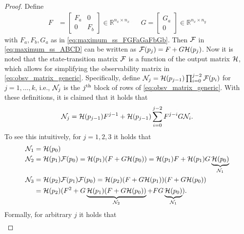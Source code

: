 \begin{proof}
    Define
    \begin{align}
        F &= \left[\begin{array}{c|c}
        F_a & 0 \\ \hline 0 & F_b
        \end{array}\right]
        \in \mathbb{R}^{n_x \times n_x} 
        & & 
        G = \left[\begin{array}{c}
            G_a \\ \hline 0
        \end{array}\right]
        \in \mathbb{R}^{n_x \times n_y}
        \label{eq:maximum_ss_F_G}
    \end{align}
    with $F_a,F_b,G_a$ as in \eqref{eq:maximum_ss_FGFaGaFbGb}. Then $\mathcal{F}$ in \eqref{eq:maximum_ss_ABCD} can be written as $\mathcal{F}(p_j) = F + G \mathcal{H}(p_j)$. Now it is noted that the state-transition matrix $\mathcal{F}$ is a function of the output matrix $\mathcal{H}$, which allows for simplifying the observability matrix in \eqref{eq:obsv_matrix_generic}. Specifically, define $\mathcal{N}_j = \mathcal{H}(p_{j-1}) \prod_{i=0}^{j-2} \mathcal{F}(p_i)$ for $j=1,\ldots,k$, i.e., $\mathcal{N}_j$ is the $j^{\textnormal{th}}$ block of rows of \eqref{eq:obsv_matrix_generic}. With these definitions, it is claimed that it holds that
    \begin{equation}\label{eq:aux}
        \mathcal{N}_j =  \mathcal{H}(p_{j-1}) F^{j-1} +  \mathcal{H}(p_{j-1}) \sum_{i=0}^{j-2} F^{j-i}G \mathcal{N}_i.
    \end{equation}
    To see this intuitively, for $j=1,2,3$ it holds that
    \begin{equation}
    \begin{aligned}
        \mathcal{N}_1 &= \mathcal{H}(p_0) \\
        \mathcal{N}_2 &= \mathcal{H}(p_1) \mathcal{F}(p_0) = \mathcal{H}(p_1) (F + G \mathcal{H}(p_0)) = \mathcal{H}(p_1) F + \mathcal{H}(p_1) G \underbrace{\mathcal{H}(p_0)}_{\mathcal{N}_1} \\
        \mathcal{N}_3 &= \mathcal{H}(p_2) \mathcal{F}(p_1) \mathcal{F}(p_0) = \mathcal{H}(p_2) (F + G \mathcal{H}(p_1)) (F + G \mathcal{H}(p_0)) \\
        &= \mathcal{H}(p_2) (F^2 + G \underbrace{\mathcal{H}(p_1) (F + G \mathcal{H}(p_0))}_{\mathcal{N}_2} + F G \underbrace{\mathcal{H}(p_0)}_{\mathcal{N}_1}). 
    \end{aligned}
    \end{equation}
    Formally, for arbitrary $j$ it holds that
    \begin{equation}
        \begin{aligned}

\end{aligned}
\end{equation}
\end{proof}
